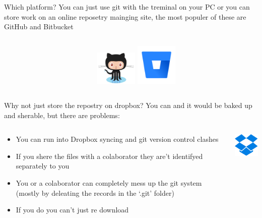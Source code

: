 \documentclass[10pt]{beamer}
\begin{document}
\begin{frame}[fragile]{Which platform?}
You can just use git with the treminal on your PC or you can store work on an online reposetry mainging site, the most populer of these are GitHub and Bitbucket\\
  \begin{columns}[T]
    \begin{column}{.8\textwidth}
    \end{column}
    \begin{column}{.2\textwidth}
	\includegraphics[width=2cm]{Figs/git/Octocat} \newline  \newline   \newline 
	\includegraphics[width=2cm]{Figs/git/Bitbucket}
    \end{column}
  \end{columns}
\end{frame}


\begin{frame}[fragile]{Why not just store the repostry on dropbox?}
You can and it would be baked up and sherable, but there are problems:\\
  \begin{columns}[T]
    \begin{column}{.8\textwidth}
	\begin{itemize}
		\item You can run into Dropbox syncing and git version control clashes
		\item If you shere the files with a colaborator they are't identifyed separately to you
		\item You or a colaborator can completely mess up the git system (mostly by deleating the records in the `.git' folder)
		\item If you do you can't just re download
	\end{itemize}
    \end{column}
    \begin{column}{.2\textwidth}
	\includegraphics[width=2cm]{Figs/git/Dropbox}
    \end{column}
  \end{columns}
\end{frame}
\end{document}
